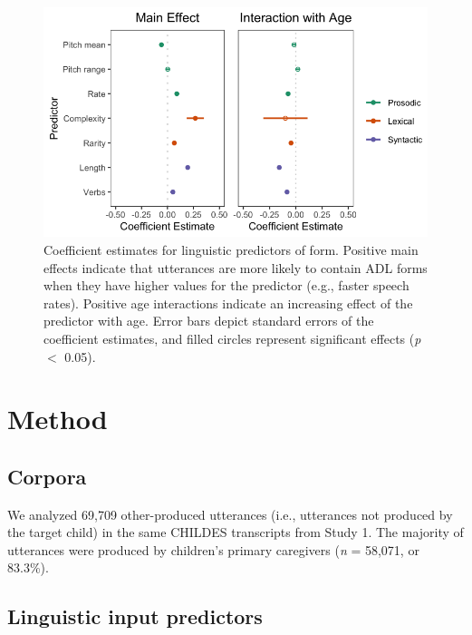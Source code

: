 \documentclass[10pt, letterpaper]{article}
\newenvironment{CodeChunk}{}{}
\begin{document}
\begin{CodeChunk}
\begin{figure}[h]

{\centering \includegraphics{figs/ling-predictors-fig-1} 

}

\caption[Coefficient estimates for linguistic predictors of form]{Coefficient estimates for linguistic predictors of form. Positive main effects indicate that utterances are more likely to contain ADL forms when they have higher values for the predictor (e.g., faster speech rates). Positive age interactions indicate an increasing effect of the predictor with age. Error bars depict standard errors of the coefficient estimates, and filled circles represent significant effects (\textit{p} $<$ 0.05).}\label{fig:ling-predictors-fig}
\end{figure}
\end{CodeChunk}

\hypertarget{method-1}{%
\section{Method}\label{method-1}}

\hypertarget{corpora-1}{%
\subsection{Corpora}\label{corpora-1}}

We analyzed 69,709 other-produced utterances (i.e., utterances not
produced by the target child) in the same CHILDES transcripts from Study
1. The majority of utterances were produced by children's primary
caregivers (\emph{n} = 58,071, or 83.3\%).

\hypertarget{linguistic-input-predictors}{%
\subsection{Linguistic input
predictors}\label{linguistic-input-predictors}}
\end{document}
